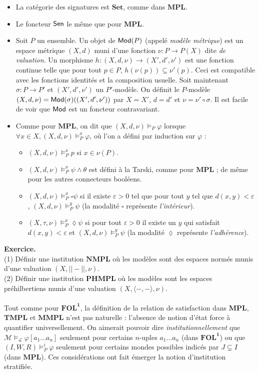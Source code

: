 \documentclass[11pt,a4paper]{article}
\newcommand{\La}{\mathcal{L}}
\newcommand{\M}{\mathcal{M}}
\newcommand{\ph}{\varphi}
\newcommand{\itemz}{\item[$\triangleright$]}
\newcommand{\gr}{\textbf}
\newcommand{\il}{\textit}
\newcommand{\info}[1]{\text{{\fontfamily{lmss}\selectfont #1}}}
\newcommand{\Mod}{\info{Mod}}
\newcommand{\Sen}{\info{Sen}}
\newcommand{\1}{\mathbbm{1}}
\begin{document}
\begin{itemize}
\itemz La catégorie des signatures est $\gr{Set}$, comme dans $\gr{MPL}$.
\itemz Le foncteur $\Sen$ le même que pour $\gr{MPL}$.
\itemz Soit $P$ un ensemble. Un objet de $\Mod(P)$ (appelé \il{modèle métrique}) est un espace métrique $(X,d)$ muni d'une fonction $\nu : P \to P(X)$ dite \il{de valuation}. Un morphisme $h : (X,d,\nu) \to (X',d',\nu')$ est une fonction continue telle que pour tout $p \in P$, $h(\nu(p)) \subseteq \nu'(p)$. Ceci est compatible avec les fonctions identités et la composition usuelle. Soit maintenant $\sigma : P \to P'$ et $(X',d',\nu')$ un $P'$-modèle. On définit le $P$-modèle $(X,d,\nu) = \Mod(\sigma)((X',d',\nu'))$ par $X = X'$, $d = d'$ et $\nu = \nu' \circ \sigma$. Il est facile de voir que $\Mod$ est un foncteur contravariant.
\itemz Comme pour $\gr{MPL}$, on dit que $(X,d,\nu) \models_P \ph$ lorsque $\forall x \in X, (X,d,\nu) \models_P^x \ph$, où l'on a défini par induction sur $\ph$ :
\begin{itemize}
\setlength\itemsep{-0.3em}
\item $(X,d,\nu) \models_P^x p$ si $x \in \nu(P)$.
\item $(X,d,\nu) \models_P^x \psi \wedge \theta$ est défini à la Tarski, comme pour $\gr{MPL}$ ; de même pour les autres connecteurs booléens.
\item $(X,d,\nu) \models_P^x \square \psi$ si il existe $\varepsilon > 0$ tel que pour tout $y$ tel que $d(x,y) < \varepsilon$, $(X,d,\nu) \models_P^y \psi$ (la modalité $\square$ représente \il{l'intérieur}).
\item $(X,\tau,\nu) \models_P^x \lozenge \psi$ si pour tout $\varepsilon > 0$ il existe un $y$ qui satisfait $d(x,y) < \varepsilon$ et $(X,d,\nu) \models_P^y \psi$ (la modalité $\lozenge$ représente \il{l'adhérence}).
\end{itemize}
\end{itemize}
\gr{Exercice.} \\ (1) Définir une institution $\gr{NMPL}$ où les modèles sont des espaces normés munis d'une valuation $(X,||-||,\nu)$. \\ (2) Définir une institution $\gr{PHMPL}$ où les modèles sont les espaces préhilbertiens munis d'une valuation $(X,\langle -, - \rangle, \nu)$. \\\\
Tout comme pour $\gr{FOL}^\gr{1}$, la définition de la relation de satisfaction dans $\gr{MPL}$, $\gr{TMPL}$ et $\gr{MMPL}$ n'est pas naturelle : l'absence de notion d'état force à quantifier universellement. On aimerait pouvoir dire \il{institutionnellement} que $\M \models_{\La} \ph[a_1...a_n]$ seulement pour certains $n$-uples $a_1...a_n$ (dans $\gr{FOL}^\gr{1}$) ou que $(I,W,R) \models_P^i \ph$ seulement pour certains mondes possibles indicés par $J \subsetneq I$ (dans $\gr{MPL}$). Ces considérations ont fait émerger la notion d'institution stratifiée.
\newpage
\end{document}
